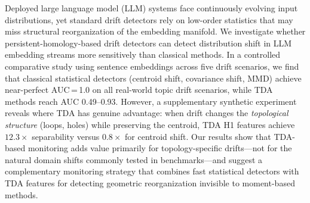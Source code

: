 Deployed large language model (LLM) systems face continuously evolving input distributions, yet standard drift detectors rely on low-order statistics that may miss structural reorganization of the embedding manifold. We investigate whether persistent-homology-based drift detectors can detect distribution shift in LLM embedding streams more sensitively than classical methods. In a controlled comparative study using \agnews sentence embeddings across five drift scenarios, we find that classical statistical detectors (centroid shift, covariance shift, MMD) achieve near-perfect AUC\,=\,1.0 on all real-world topic drift scenarios, while TDA methods reach AUC 0.49--0.93. However, a supplementary synthetic experiment reveals where TDA has genuine advantage: when drift changes the \emph{topological structure} (loops, holes) while preserving the centroid, TDA H1 features achieve $12.3\times$ separability versus $0.8\times$ for centroid shift. Our results show that TDA-based monitoring adds value primarily for topology-specific drifts---not for the natural domain shifts commonly tested in benchmarks---and suggest a complementary monitoring strategy that combines fast statistical detectors with TDA features for detecting geometric reorganization invisible to moment-based methods.
